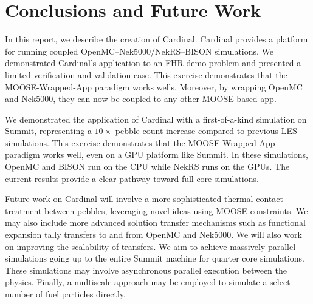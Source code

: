 
\section{Conclusions and Future Work}
\label{s:sum}


In this report, we describe the creation of Cardinal. Cardinal provides a platform for running coupled
OpenMC--Nek5000/NekRS--BISON simulations. We demonstrated Cardinal's application to an FHR demo problem and
presented a limited verification and validation case. This exercise demonstrates that the MOOSE-Wrapped-App
paradigm works wells. Moreover, by wrapping OpenMC and Nek5000, they can now be coupled to any other MOOSE-based app.

We demonstrated the application of Cardinal with a first-of-a-kind simulation on Summit, representing a $10\times$ pebble count increase compared to previous LES simulations. This exercise demonstrates that the MOOSE-Wrapped-App paradigm works well, even on a GPU platform like Summit. In these simulations, OpenMC and BISON run on the CPU while NekRS runs on the GPUs. The current results provide a clear pathway toward full core simulations.

Future work on Cardinal will involve a more sophisticated thermal contact treatment between pebbles,
leveraging novel ideas using MOOSE constraints. We may also include more advanced solution transfer
mechanisms such as functional expansion tally transfers to and from OpenMC and Nek5000. We
will also work on improving the scalability of transfers. We aim to achieve massively parallel simulations going up to the entire Summit machine
for quarter core simulations. These simulations may involve asynchronous parallel execution between the
physics. Finally, a multiscale approach may be employed to simulate a select number of fuel particles directly.
